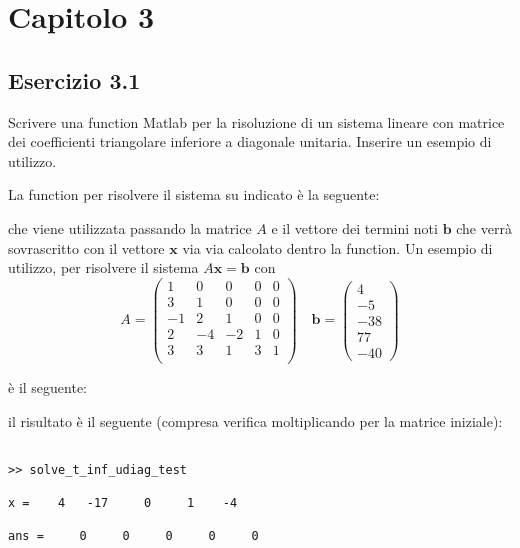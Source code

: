 \section{Capitolo 3}


	\subsection{Esercizio 3.1}

Scrivere una function Matlab per la risoluzione di un sistema lineare con matrice dei coefficienti triangolare inferiore a diagonale unitaria. Inserire un esempio di utilizzo.

La function per risolvere il sistema su indicato è la seguente:



che viene utilizzata passando la matrice $A$ e il vettore dei termini noti $\mathbf{b}$ che verrà sovrascritto con il vettore $\mathbf{x}$ via via calcolato dentro la function. 
Un esempio di utilizzo, per risolvere il sistema $A\mathbf{x}=\mathbf{b}$ con
	\[	
		A = 
		\begin{pmatrix}
			1&0&0&0&0 \\
			3&1&0&0&0\\
			-1&2&1&0&0\\
			2&-4&-2&1&0\\
			3&3&1&3&1\\
		\end{pmatrix}
		\quad 
		\mathbf{b}=
		\begin{pmatrix}	4 \\ -5 \\ -38 \\ 77 \\ -40 \end{pmatrix}
	\]
	
 è il seguente:
 


il risultato è il seguente (compresa verifica moltiplicando per la matrice iniziale):

\begin{lstlisting}[frame=single]

>> solve_t_inf_udiag_test

x =    4   -17     0     1    -4

ans =     0     0     0     0     0

\end{lstlisting}

